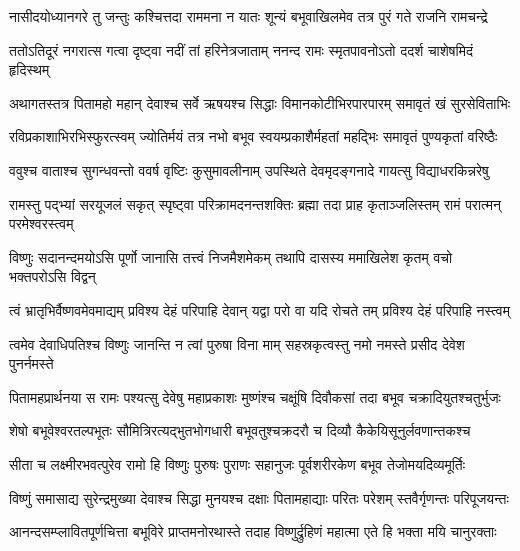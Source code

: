 \fourlineindentedshloka
{नासीदयोध्यानगरे तु जन्तुः}
{कश्चित्तदा राममना न यातः}
{शून्यं बभूवाखिलमेव तत्र}
{पुरं गते राजनि रामचन्द्रे} %

\fourlineindentedshloka
{ततोऽतिदूरं नगरात्स गत्वा}
{दृष्ट्वा नदीं तां हरिनेत्रजाताम्}
{ननन्द रामः स्मृतपावनोऽतो}
{ददर्श चाशेषमिदं हृदिस्थम्} %

\fourlineindentedshloka
{अथागतस्तत्र पितामहो महान्}
{देवाश्च सर्वे ऋषयश्च सिद्धाः}
{विमानकोटीभिरपारपारम्}
{समावृतं खं सुरसेविताभिः} %

\fourlineindentedshloka
{रविप्रकाशाभिरभिस्फुरत्स्वम्}
{ज्योतिर्मयं तत्र नभो बभूव}
{स्वयम्प्रकाशैर्महतां महद्भिः}
{समावृतं पुण्यकृतां वरिष्ठैः} %

\fourlineindentedshloka
{ववुश्च वाताश्च सुगन्धवन्तो}
{ववर्ष वृष्टिः कुसुमावलीनाम्}
{उपस्थिते देवमृदङ्गनादे}
{गायत्सु विद्याधरकिन्नरेषु} %

\fourlineindentedshloka
{रामस्तु पद्भ्यां सरयूजलं सकृत्}
{स्पृष्ट्वा परिक्रामदनन्तशक्तिः}
{ब्रह्मा तदा प्राह कृताञ्जलिस्तम्}
{रामं परात्मन् परमेश्वरस्त्वम्} %

\fourlineindentedshloka
{विष्णुः सदानन्दमयोऽसि पूर्णो}
{जानासि तत्त्वं निजमैशमेकम्}
{तथापि दासस्य ममाखिलेश कृतम्}
{वचो भक्तपरोऽसि विद्वन्} %

\fourlineindentedshloka
{त्वं भ्रातृभिर्वैष्णवमेवमाद्यम्}
{प्रविश्य देहं परिपाहि देवान्}
{यद्वा परो वा यदि रोचते तम्}
{प्रविश्य देहं परिपाहि नस्त्वम्} %

\fourlineindentedshloka
{त्वमेव देवाधिपतिश्च विष्णुः}
{जानन्ति न त्वां पुरुषा विना माम्}
{सहस्रकृत्वस्तु नमो नमस्ते}
{प्रसीद देवेश पुनर्नमस्ते} %

\fourlineindentedshloka
{पितामहप्रार्थनया स रामः}
{पश्यत्सु देवेषु महाप्रकाशः}
{मुष्णंश्च चक्षूंषि दिवौकसां तदा}
{बभूव चक्रादियुतश्चतुर्भुजः} %

\fourlineindentedshloka
{शेषो बभूवेश्वरतल्पभूतः}
{सौमित्रिरत्यद्भुतभोगधारी}
{बभूवतुश्चक्रदरौ च दिव्यौ}
{कैकेयिसूनुर्लवणान्तकश्च} %

\fourlineindentedshloka
{सीता च लक्ष्मीरभवत्पुरेव}
{रामो हि विष्णुः पुरुषः पुराणः}
{सहानुजः पूर्वशरीरकेण}
{बभूव तेजोमयदिव्यमूर्तिः} %

\fourlineindentedshloka
{विष्णुं समासाद्य सुरेन्द्रमुख्या}
{देवाश्च सिद्धा मुनयश्च दक्षाः}
{पितामहाद्याः परितः परेशम्}
{स्तवैर्गृणन्तः परिपूजयन्तः} %

\fourlineindentedshloka
{आनन्दसम्प्लावितपूर्णचित्ता}
{बभूविरे प्राप्तमनोरथास्ते}
{तदाह विष्णुर्द्रुहिणं महात्मा}
{एते हि भक्ता मयि चानुरक्ताः} %

